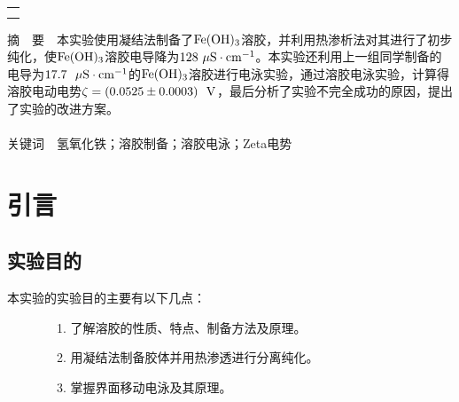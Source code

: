 \documentclass[12pt]{article}
\begin{document}
\begin{titlepage}
\begin{center}
            \begin{tabular*}{\textwidth}{c}
                \\ %
                \\ %
                \\ %
                \hline %
            \end{tabular*}
        \end{center}
        \textsf{\textcolor{BrickRed}{摘\ \ 要}}\ \ 本实验使用凝结法制备了$\rm Fe(OH)_{3}$溶胶，并利用热渗析法对其进行了初步纯化，使$\rm Fe(OH)_{3}$溶胶电导降为$128\  {\rm \mu S\cdot cm^{-1}}$。本实验还利用上一组同学制备的电导为$17.7\ \ {\rm \mu S\cdot cm^{-1}}$的$\rm Fe(OH)_{3}$溶胶进行电泳实验，通过溶胶电泳实验，计算得溶胶电动电势$\zeta=(0.0525\pm 0.0003)\ \ {\rm V}$，最后分析了实验不完全成功的原因，提出了实验的改进方案。
        \\
        \\
        \textsf{\textcolor{BrickRed}{关键词}}\ \ 氢氧化铁；溶胶制备；溶胶电泳；Zeta电势
    \end{titlepage}

    \section{引言}
		\subsection{实验目的}
			本实验的实验目的主要有以下几点\cite{physchemlab}：\par
			\ \ \ \ \ \ \ \ 1. 了解溶胶的性质、特点、制备方法及原理。\par
			\ \ \ \ \ \ \ \	2. 用凝结法制备胶体并用热渗透进行分离纯化。\par
			\ \ \ \ \ \ \ \	3. 掌握界面移动电泳及其原理。\par
\end{document}
